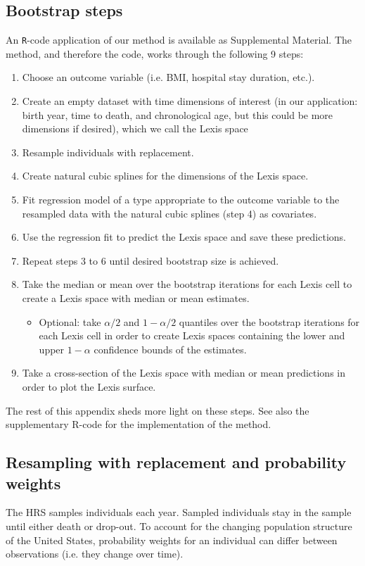 \documentclass[12pt,oneside,letterpaper,doublespacing]{article}  %
\begin{document}
\begin{appendices}
\subsection{Bootstrap steps}
An \texttt{R}-code application of our method is available as Supplemental Material. The method, and therefore the code, works through the following 9 steps:
\begin{enumerate}
\item{Choose an outcome variable (i.e. BMI, hospital stay duration, etc.).}
\item{Create an empty dataset with time dimensions of interest (in our application: birth year, time to death, and chronological age, but this could be more dimensions if desired), which we call the Lexis space}
\item{Resample individuals with replacement.}
\item{Create natural cubic splines for the dimensions of the Lexis space.}
\item{Fit regression model of a type appropriate to the outcome variable to the resampled data with the natural cubic splines (step 4) as covariates.}
\item{Use the regression fit to predict the Lexis space and save these predictions.}
\item{Repeat steps 3 to 6 until desired bootstrap size is achieved.}
\item{Take the median or mean over the bootstrap iterations for each Lexis cell to create a Lexis space with median or mean estimates.\begin{itemize}\item{Optional: take $\alpha/2$ and  $1-\alpha/2$ quantiles over the bootstrap iterations for each Lexis cell in order to create Lexis spaces containing the lower and upper $1-\alpha$ confidence bounds of the estimates.}\end{itemize}}
\item{Take a cross-section of the Lexis space with median or mean predictions in order to plot the Lexis surface.}
\end{enumerate}

The rest of this appendix sheds more light on these steps. See also the supplementary R-code for the implementation of the method.

\subsection{Resampling with replacement and probability weights}
The HRS samples individuals each year. Sampled individuals stay in the sample until either death or drop-out. To account for the changing population structure of the United States, probability weights for an individual can differ between observations (i.e. they change over time).


\end{appendices}
\end{document}
